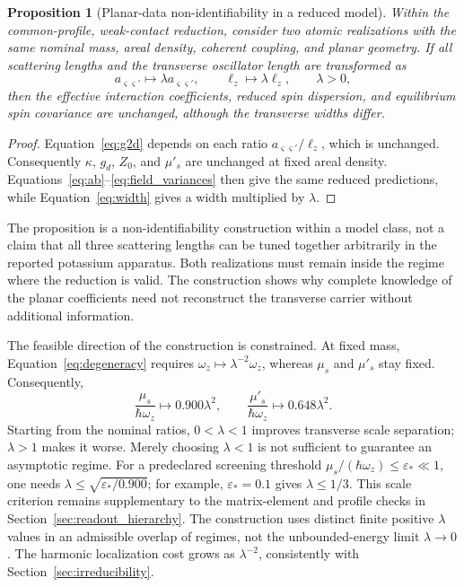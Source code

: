 \documentclass[11pt,a4paper]{article}
\newtheorem{proposition}{Proposition}[section]
\theoremstyle{definition}
\theoremstyle{remark}
\newcommand{\musp}{\mu'_s}
\newcommand{\lop}{\ell_z}
\begin{document}
\begin{proposition}[Planar-data non-identifiability in a reduced model]
Within the common-profile, weak-contact reduction, consider two atomic realizations with the same nominal mass, areal density, coherent coupling, and planar geometry. If all scattering lengths and the transverse oscillator length are transformed as
\begin{equation}
 a_{\varsigma\varsigma'}\longmapsto\lambda a_{\varsigma\varsigma'},
 \qquad \lop\longmapsto\lambda\lop,
 \qquad \lambda>0,
 \label{eq:degeneracy}
\end{equation}
then the effective interaction coefficients, reduced spin dispersion, and equilibrium spin covariance are unchanged, although the transverse widths differ.
\end{proposition}
\begin{proof}
Equation~\eqref{eq:g2d} depends on each ratio $a_{\varsigma\varsigma'}/\lop$, which is unchanged. Consequently $\kappa$, $g_d$, $Z_0$, and $\musp$ are unchanged at fixed areal density. Equations~\eqref{eq:ab}--\eqref{eq:field_variances} then give the same reduced predictions, while Equation~\eqref{eq:width} gives a width multiplied by $\lambda$.
\end{proof}

The proposition is a non-identifiability construction within a model class, not a claim that all three scattering lengths can be tuned together arbitrarily in the reported potassium apparatus. Both realizations must remain inside the regime where the reduction is valid. The construction shows why complete knowledge of the planar coefficients need not reconstruct the transverse carrier without additional information.

The feasible direction of the construction is constrained. At fixed mass, Equation~\eqref{eq:degeneracy} requires $\omega_z\mapsto\lambda^{-2}\omega_z$, whereas $\mu_s$ and $\musp$ stay fixed. Consequently,
\begin{equation}
 \frac{\mu_s}{\hbar\omega_z}\longmapsto0.900\lambda^2,
 \qquad
 \frac{\musp}{\hbar\omega_z}\longmapsto0.648\lambda^2.
 \tag{59a}\label{eq:lambda_validity}
\end{equation}
Starting from the nominal ratios, $0<\lambda<1$ improves transverse scale separation; $\lambda>1$ makes it worse. Merely choosing $\lambda<1$ is not sufficient to guarantee an asymptotic regime. For a predeclared screening threshold $\mu_s/(\hbar\omega_z)\leq\varepsilon_*\ll1$, one needs $\lambda\leq\sqrt{\varepsilon_*/0.900}$; for example, $\varepsilon_*=0.1$ gives $\lambda\leq1/3$. This scale criterion remains supplementary to the matrix-element and profile checks in Section~\ref{sec:readout_hierarchy}. The construction uses distinct finite positive $\lambda$ values in an admissible overlap of regimes, not the unbounded-energy limit $\lambda\to0$. The harmonic localization cost grows as $\lambda^{-2}$, consistently with Section~\ref{sec:irreducibility}.
\end{document}
